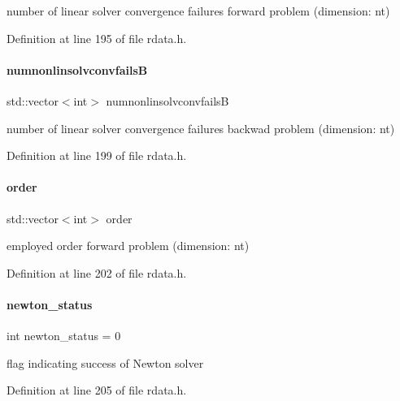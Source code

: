 number of linear solver convergence failures forward problem (dimension\+: nt) 

Definition at line 195 of file rdata.\+h.

\mbox{\label{classamici_1_1_return_data_a9150501f058304e49bb6a52152cc9550}} 
\paragraph{\texorpdfstring{numnonlinsolvconvfailsB}{numnonlinsolvconvfailsB}}
{\footnotesize\ttfamily std\+::vector$<$int$>$ numnonlinsolvconvfailsB}

number of linear solver convergence failures backwad problem (dimension\+: nt) 

Definition at line 199 of file rdata.\+h.

\mbox{\label{classamici_1_1_return_data_a75a1634d2dab77d47af4eb58e6dc965e}} 
\paragraph{\texorpdfstring{order}{order}}
{\footnotesize\ttfamily std\+::vector$<$int$>$ order}

employed order forward problem (dimension\+: nt) 

Definition at line 202 of file rdata.\+h.

\mbox{\label{classamici_1_1_return_data_a7a12031049f81ccdd4496bd4506c6d28}} 
\paragraph{\texorpdfstring{newton\_status}{newton\_status}}
{\footnotesize\ttfamily int newton\+\_\+status = 0}

flag indicating success of Newton solver 

Definition at line 205 of file rdata.\+h.

\mbox{\label{classamici_1_1_return_data_a848d9dd3e74e2a55652ae304ac18687c}} 
